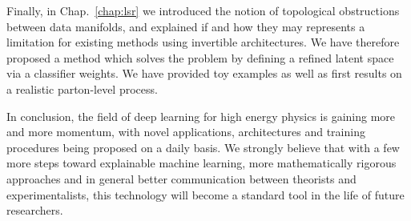 \medskip

Finally, in Chap.~\ref{chap:lsr} we introduced the notion of topological obstructions between data manifolds, and explained if and how they may represents a limitation for existing methods using invertible architectures. We have therefore proposed a method which solves the problem by defining a refined latent space via a classifier weights. We have provided toy examples as well as first results on a realistic parton-level process.

\medskip



\medskip

In conclusion, the field of deep learning for high energy physics is gaining more and more momentum, with novel applications, architectures and training procedures being proposed on a daily basis. We strongly believe that with a few more steps toward explainable machine learning, more mathematically rigorous approaches and in general better communication between theorists and experimentalists, this technology will become a standard tool in the life of future researchers.
